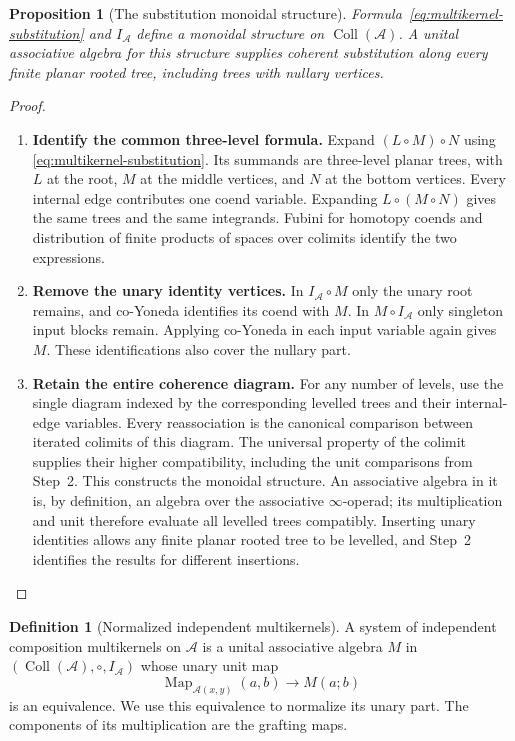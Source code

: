 \documentclass[oneside]{article}
\theoremstyle{plain}
\newtheorem{proposition}[theorem]{Proposition}
\theoremstyle{definition}
\newtheorem{definition}[theorem]{Definition}
\theoremstyle{remark}
\newcommand{\Map}{\operatorname{Map}}
\begin{document}
\begin{proposition}[The substitution monoidal structure]
\label{prop:substitution-monoidal}
Formula~\eqref{eq:multikernel-substitution} and
$I_{\mathcal A}$ define a monoidal structure on
$\operatorname{Coll}(\mathcal A)$. A unital associative algebra
for this structure supplies coherent substitution along every finite
planar rooted tree, including trees with nullary vertices.
\end{proposition}
\begin{proof}
\leavevmode
\begin{enumerate}
\item \textbf{Identify the common three-level formula.}
Expand $(L\circ M)\circ N$ using
\eqref{eq:multikernel-substitution}. Its summands are three-level
planar trees, with $L$ at the root, $M$ at the middle vertices,
and $N$ at the bottom vertices. Every internal edge contributes
one coend variable. Expanding $L\circ(M\circ N)$ gives the same
trees and the same integrands. Fubini for homotopy coends and
distribution of finite products of spaces over colimits identify
the two expressions.
\item \textbf{Remove the unary identity vertices.}
In $I_{\mathcal A}\circ M$ only the unary root remains, and
co-Yoneda identifies its coend with $M$. In $M\circ I_{\mathcal A}$
only singleton input blocks remain. Applying co-Yoneda in each
input variable again gives $M$. These identifications also cover
the nullary part.
\item \textbf{Retain the entire coherence diagram.}
For any number of levels, use the single diagram indexed by the
corresponding levelled trees and their internal-edge variables.
Every reassociation is the canonical comparison between iterated
colimits of this diagram. The universal property of the colimit
supplies their higher compatibility, including the unit comparisons
from Step~2. This constructs the monoidal structure. An associative
algebra in it is, by definition, an algebra over the associative
$\infty$-operad; its multiplication and unit therefore evaluate
all levelled trees compatibly. Inserting unary identities allows
any finite planar rooted tree to be levelled, and Step~2 identifies
the results for different insertions.\qedhere
\end{enumerate}
\end{proof}

\begin{definition}[Normalized independent multikernels]
\label{def:independent-multikernels}
A system of independent composition multikernels on $\mathcal A$
is a unital associative algebra $M$ in
$(\operatorname{Coll}(\mathcal A),\circ,I_{\mathcal A})$
whose unary unit map
\[
 \Map_{\mathcal A(x,y)}(a,b)\longrightarrow M(a;b)
\]
is an equivalence. We use this equivalence to normalize its unary
part. The components of its multiplication are the grafting maps.
\end{definition}
\end{document}
